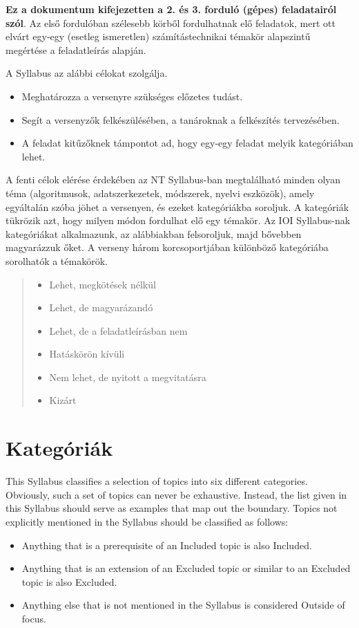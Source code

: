 \documentclass[a4paper,11pt,oneside]{article}
\newcommand{\cmark}{\ding{51}}%
\newcommand{\xmark}{\ding{55}}%
\newcommand{\cincl}{{\small\cmark}}
\newcommand{\cdefi}{{\small\cmark\faFileTextO}}
\newcommand{\ccode}{{\small\cmark\faFileText}}
\newcommand{\cnfoc}{{\small\faQuestion}}
\newcommand{\cemay}{{\small\xmark\faQuestionCircle}}
\newcommand{\cexcl}{{\small\xmark}}
\newcommand{\Iincluded}{\item[\hbox to 1.8em{\cincl\hfill}]}
\newcommand{\Idefine}{\item[\hbox to 1.8em{\cdefi\hfill}]}
\newcommand{\Icodeonly}{\item[\hbox to 1.8em{\ccode\hfill}]}
\newcommand{\Inofocus}{\item[\hbox to 1.8em{\cnfoc\hfill}]}
\newcommand{\Iexmaybe}{\item[\hbox to 1.8em{\cemay\hfill}]}
\newcommand{\Iexcluded}{\item[\hbox to 1.8em{\cexcl\hfill}]}
\newenvironment{myitemize}{\begin{quote}\begin{itemize}\itemsep 0pt}{\end{itemize}\end{quote}}
\begin{document}
\textbf{Ez a dokumentum kifejezetten a 2. és 3. forduló (gépes) feladatairól szól}.
Az első fordulóban szélesebb körből fordulhatnak elő feladatok, mert ott elvárt egy-egy
(esetleg ismeretlen) számítástechnikai témakör alapszintű megértése a feladatleírás alapján.

A Syllabus az alábbi célokat szolgálja.

\begin{itemize}
\item
Meghatározza a versenyre szükséges előzetes tudást.

\item
Segít a versenyzők felkészülésében, a tanároknak a felkészítés tervezésében.

\item
A feladat kitűzőknek támpontot ad, hogy egy-egy feladat melyik kategóriában lehet.

\end{itemize}

A fenti célok elérése érdekében az NT Syllabus-ban megtalálható minden olyan téma
(algoritmusok, adatszerkezetek, módszerek, nyelvi eszközök), amely egyáltalán szóba jöhet a versenyen,
és ezeket kategóriákba soroljuk. A kategóriák tükrözik azt, hogy milyen módon fordulhat elő egy témakör.
Az IOI Syllabus-nak kategóriákat alkalmazunk, az alábbiakban felsoroljuk, majd bővebben magyarázzuk őket.
A verseny három korcsoportjában különböző kategóriába sorolhatók a témakörök.

\begin{myitemize}
\Iincluded Lehet, megkötések nélkül
\Idefine   Lehet, de magyarázandó
\Icodeonly Lehet, de a feladatleírásban nem
\Inofocus  Hatáskörön kívüli
\Iexmaybe  Nem lehet, de nyitott a megvitatásra
\Iexcluded Kizárt
\end{myitemize}



\section{Kategóriák}\label{sec:categories}%

This Syllabus classifies a selection of topics into six different ca\-tegories. 
Obviously, such a set of topics can never be exhaustive.
Instead, the list given in this Syllabus should serve as examples that map out the boundary.
Topics not explicitly mentioned in the Syllabus should be classified as follows:
\begin{itemize}
\itemsep -3pt
\item Anything that is a prerequisite of an Included topic is also Included.
\item Anything that is an extension of an Excluded topic or similar to an Excluded topic is also Excluded.
\item Anything else that is not mentioned in the Syllabus is considered Outside of focus.
\end{itemize}
\end{document}
